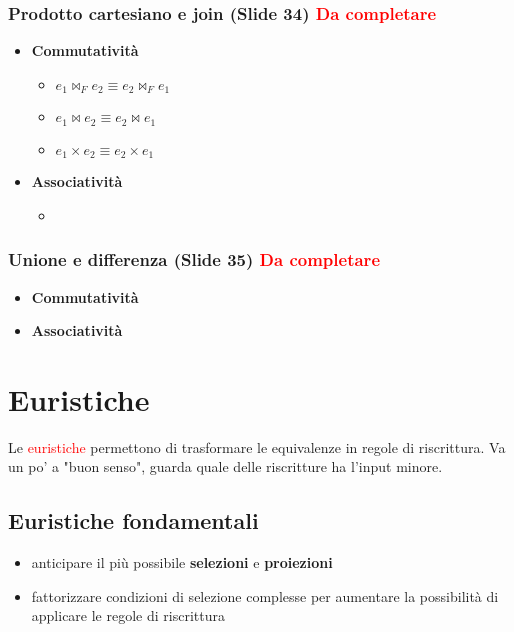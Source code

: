 \documentclass[12pt]{article}
\begin{document}
\subsubsection{Prodotto cartesiano e join (Slide 34) \textcolor{red}{Da completare}}
\begin{itemize}
    \item \textbf{Commutatività} \begin{itemize}
        \item $e_{1} \Join_{F} e_{2} \equiv e_{2} \Join_{F} e_{1}$
        \item $e_{1} \Join e_{2} \equiv e_{2} \Join e_{1}$
        \item $e_{1} \times e_{2} \equiv e_{2} \times e_{1}$
    \end{itemize}
    \item \textbf{Associatività} \begin{itemize}
        \item 
    \end{itemize}
\end{itemize}
\subsubsection{Unione e differenza (Slide 35) \textcolor{red}{Da completare}}
\begin{itemize}
    \item \textbf{Commutatività}
    \item \textbf{Associatività}
\end{itemize}
\section{Euristiche}
Le \textcolor{red}{euristiche} permettono di trasformare le equivalenze in
regole di riscrittura. Va un po' a "buon senso", guarda quale delle riscritture ha l'input minore.
\subsection{Euristiche fondamentali}
\begin{itemize}
    \item anticipare il più possibile \textbf{selezioni} e \textbf{proiezioni}
    \item fattorizzare condizioni di selezione complesse per aumentare la possibilità di applicare le regole di riscrittura
\end{itemize}
\end{document}
